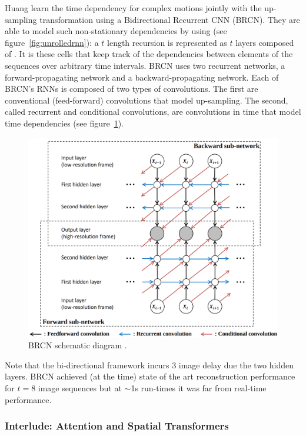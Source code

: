 
Huang \etal \cite{huang2015bidirectional} learn the time dependency for complex motions jointly with the up-sampling transformation using a Bidirectional Recurrent CNN (BRCN). 
%
%
They are able to model such non-stationary dependencies by using  (see figure~\ref{fig:unrolledrnn}): a \(t\) length recursion is represented as \(t\) layers composed of .
%
It is these cells that keep track of the dependencies between elements of the sequences over arbitrary time intervals.
%
%
BRCN uses two recurrent networks, a forward-propagating network and a backward-propagating network.
%
Each of BRCN's RNNs is composed of two types of convolutions. 
%
The first are conventional (feed-forward) convolutions that model up-sampling.
%
The second, called recurrent and conditional convolutions, are convolutions in time that model time dependencies (see figure~\ref{fig:brcn}).
\begin{figure}[!htbp]
    \includegraphics[width=.49\textwidth]{figures/neural_networks/brcn.png}
    \caption{BRCN schematic diagram \cite{huang2015bidirectional}.}\label{fig:brcn}
\end{figure}
%
Note that the bi-directional framework incurs 3 image delay due the two hidden layers.
%
BRCN achieved (at the time) state of the art reconstruction performance for \(t=8\) image sequences but at \(\sim\)1s run-times it was far from real-time performance.




\subsubsection{Interlude: Attention and Spatial Transformers}\label{subsubsec:spatialtrans}


